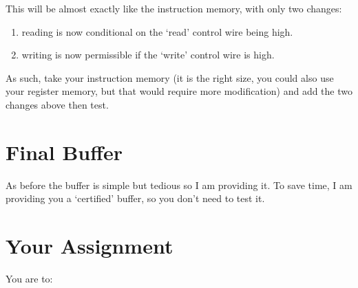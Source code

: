 This will be almost exactly like the instruction memory, with only two changes:
\begin{enumerate}
\item reading is now conditional on the `read' control wire being high.
\item writing is now permissible if the `write' control wire is high.
\end{enumerate}
As such, take your instruction memory (it is the right size, you could also use your register memory, but that would require more modification) and add the two changes above then test.

\section{Final Buffer}

As before the buffer is simple but tedious so I am providing it.  To save time, I am providing you a `certified' buffer, so you don't need to test it.

\section{Your Assignment}

You are to:
